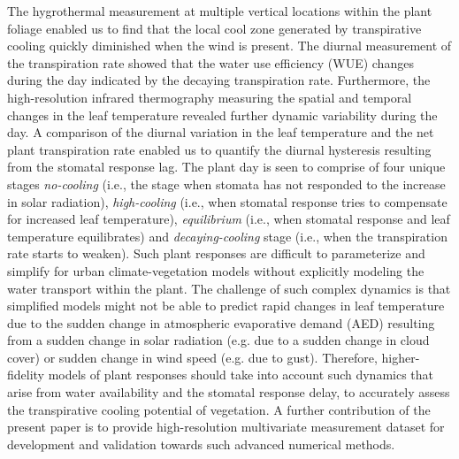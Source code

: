 The hygrothermal measurement at multiple vertical locations within the plant foliage enabled us to find that the local cool zone generated by transpirative cooling quickly diminished when the wind is present. The diurnal measurement of the transpiration rate showed that the water use efficiency (WUE) changes during the day indicated by the decaying transpiration rate. Furthermore, the high-resolution infrared thermography measuring the spatial and temporal changes in the leaf temperature revealed further dynamic variability during the day. A comparison of the diurnal variation in the leaf temperature and the net plant transpiration rate enabled us to quantify the diurnal hysteresis resulting from the stomatal response lag. The plant day is seen to comprise of four unique stages \textit{no-cooling} (i.e., the stage when stomata has not responded to the increase in solar radiation),\textit{ high-cooling} (i.e., when stomatal response tries to compensate for increased leaf temperature), \textit{equilibrium} (i.e., when stomatal response and leaf temperature equilibrates) and \textit{decaying-cooling} stage (i.e., when the transpiration rate starts to weaken). Such plant responses are difficult to parameterize and simplify for urban climate-vegetation models without explicitly modeling the water transport within the plant. The challenge of such complex dynamics is that simplified models might not be able to predict rapid changes in leaf temperature due to the sudden change in atmospheric evaporative demand (AED) resulting from a sudden change in solar radiation (e.g. due to a sudden change in cloud cover) or sudden change in wind speed (e.g. due to gust). Therefore, higher-fidelity models of plant responses should take into account such dynamics that arise from water availability and the stomatal response delay, to accurately assess the transpirative cooling potential of vegetation. A further contribution of the present paper is to provide high-resolution multivariate measurement dataset for development and validation towards such advanced numerical methods. 
